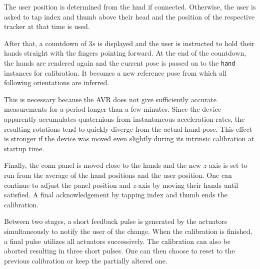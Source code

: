 \documentclass[hyperref, bachelorofscience]{cgvpub}
\begin{document}
The user position is determined from the \acrshort{hmd} if connected. Otherwise, the user is asked to tap index and thumb above their head and the position of the respective tracker at that time is used.

After that, a countdown of $ 3s $ is displayed and the user is instructed to hold their hands straight with the fingers pointing forward. At the end of the countdown, the hands are rendered again and the current pose is passed on to the \lstinline|hand| instances for calibration. It becomes a new reference pose from which all following orientations are inferred. 

This is necessary because the \Gls{AVR} does not give sufficiently accurate measurements for a period longer than a few minutes. Since the device apparently accumulates quaternions from instantaneous acceleration rates, the resulting rotations tend to quickly diverge from the actual hand pose. This effect is stronger if the device was moved even slightly during its intrinsic calibration at startup time.

Finally, the conn panel is moved close to the hands and the new $ z $-axis is set to run from the average of the hand positions and the user position. One can continue to adjust the panel position and $ z $-axis by moving their hands until satisfied. A final acknowledgement by tapping index and thumb ends the calibration.

Between two stages, a short feedback pulse  is generated by the actuators simultaneously to notify the user of the change. When the calibration is finished, a final pulse utilizes all actuators successively. The calibration can also be aborted resulting in three short pulses. One can then choose to reset to the previous calibration or keep the partially altered one.

\printglossary[type=gloss_terms]
\printglossary[type=gloss_acr]
\end{document}
